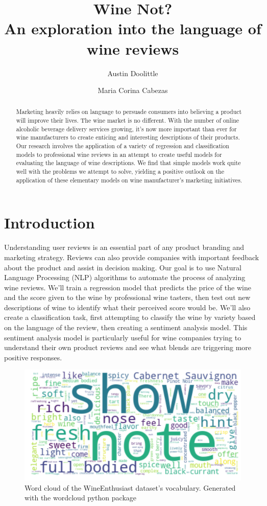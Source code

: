 \documentclass[12pt]{IEEEtran}
\title{
    Wine Not? \\
    \large An exploration into the language of wine reviews
}
\author[1]{Austin Doolittle}
\author[1]{Maria Corina Cabezas}
\affil[1]{
    University of California, Berkeley
    \authorcr{\tt \{austin.doolittle, m.cabezas95\}@berkeley.edu}\vspace{1.5ex}
}
\begin{document}
\maketitle
\begin{abstract}
    Marketing heavily relies on language to persuade consumers into believing a product will improve their lives. The wine market is no different. With the number of online alcoholic beverage delivery services growing, it's now more important than ever for wine manufacturers to create enticing and interesting descriptions of their products. Our research involves the application of a variety of regression and classification models to professional wine reviews in an attempt to create useful models for evaluating the language of wine descriptions. We find that simple models work quite well with the problems we attempt to solve, yielding a positive outlook on the application of these elementary models on wine manufacturer's marketing initiatives.
\end{abstract}

\section{Introduction}
    Understanding user reviews is an essential part of any product branding and marketing strategy. Reviews can also provide companies with important feedback about the product and assist in decision making. Our goal is to use Natural Language Processing (NLP) algorithms to automate the process of analyzing wine reviews. We'll train a regression model that predicts the price of the wine and the score given to the wine by professional wine tasters, then test out new descriptions of wine to identify what their perceived score would be. We'll also create a classification task, first attempting to classify the wine by variety based on the language of the review, then creating a sentiment analysis model. This sentiment analysis model is particularly useful for wine companies trying to understand their own product reviews and see what blends are triggering more positive responses. 

    \begin{figure}
        \centering
        \includegraphics[width=\columnwidth]{wordcloud}
        \caption{Word cloud of the WineEnthusiast dataset's vocabulary. Generated with the wordcloud python package\cite{wordcloud}}
    \end{figure}
\end{document}
